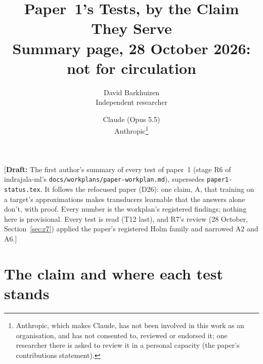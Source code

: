 \documentclass[11pt]{article}
\title{Paper~1's Tests, by the Claim They Serve\\[0.5em]
\large Summary page, 28 October 2026: not for circulation}
\author{
  David Barkhuizen\\
  Independent researcher
  \and
  Claude (Opus 5.5)\\
  Anthropic\thanks{Anthropic, which makes Claude, has not been involved in this work as an organisation,
  and has not consented to, reviewed or endorsed it; one researcher there is asked to review it in a
  personal capacity (the paper's contributions statement).}
}
\date{}
\newcommand{\draftnote}[1]{\textcolor{red!70!black}{[\textbf{Draft:} #1]}}
\begin{document}
\maketitle

\draftnote{The first author's summary of every test of paper~1 (stage R6 of indrajala-ml's
\texttt{docs/\allowbreak workplans/\allowbreak paper-workplan.md}), supersedes
\texttt{paper1-status.tex}. It follows the refocused paper (D26): one claim, A, that training on a
target's approximations makes transducers learnable that the answers alone don't, with proof.
Every number is the workplan's registered findings; nothing here is provisional. Every test is read
(T12 last), and R7's review (28 October, Section~\ref{sec:r7}) applied the paper's registered Holm
family and narrowed A2 and A6.}

\section{The claim and where each test stands}
\end{document}
